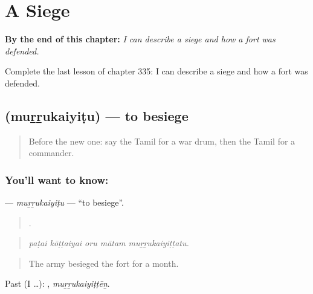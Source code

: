 
\chapter{A Siege}
\label{ch:ta-a-siege}

\begin{chapteropening}
\textbf{By the end of this chapter:} \emph{I can describe a siege and how a fort was defended.}

Complete the last lesson of chapter 335: I can describe a siege and how a fort was defended.
\end{chapteropening}

\section[\texorpdfstring{\ta{முற்றுகையிடு} (muṟṟukaiyiṭu)}{முற்றுகையிடு (muṟṟukaiyiṭu)}]{ (muṟṟukaiyiṭu) — to besiege}

\label{lesson:TA-C335-murrukaiyitu}



\begin{quote}
Before the new one: say the Tamil for a war drum, then the Tamil for a commander.
\end{quote}

\subsection*{You'll want to know: }
\textbf{} — \emph{muṟṟukaiyiṭu} — \textquotedblleft{}to besiege\textquotedblright{}.

\begin{quote}
    .
\end{quote}

\begin{quote}
\emph{paṭai kōṭṭaiyai oru mātam muṟṟukaiyiṭṭatu.}
\end{quote}

\begin{quote}
The army besieged the fort for a month.
\end{quote}

Past (I …): , \emph{muṟṟukaiyiṭṭēṉ}.

